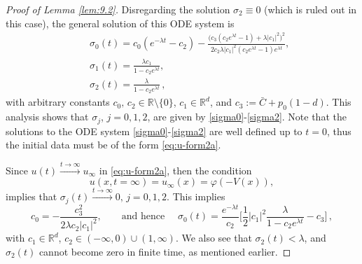 \documentclass[reqno]{amsart}
\newcommand{\R}{\mathbb{R}}
\begin{document}
\begin{proof}[Proof of Lemma \ref{lem:9.2}]
Disregarding the solution $\sigma_2\equiv0$ (which is ruled out in this case), the general solution of this ODE system is
\begin{eqnarray}
    && \sigma_0(t) =c_0(e^{-\lambda t}-c_2)-\frac{\big(c_3(c_2e^{\lambda t}-1)+\lambda|c_1|^2\Big)^2}{2c_2\lambda|c_1|^2(c_2e^{\lambda t}-1)e^{\lambda t}}, \label{sigma0}\\
    && \sigma_1(t)=\frac{\lambda c_1}{1-c_2 e^{\lambda t}}, \nonumber \\ %
    && \sigma_2(t)= \frac{\lambda}{1-c_2 e^{\lambda t}}\,, \label{sigma2}
\end{eqnarray}
with arbitrary constants $c_0,\,c_2\in\R\setminus\{0\}$, $c_1\in\R^d$, and $c_3:=\bar C+p_0(1-d)$. This analysis shows that $\sigma_j$, $j=0,1,2$, are given by \eqref{sigma0}-\eqref{sigma2}. Note that the solutions to the ODE system \eqref{sigma0}-\eqref{sigma2} are well defined up to $t=0$, thus the initial data must be of the form \eqref{eq:u-form2a}.

Since $u(t)\stackrel{t\to\infty}{\longrightarrow} u_\infty$ in \eqref{eq:u-form2a}, then the condition 
\begin{equation}\label{u-at-infty-a}
    u(x,t=\infty)=u_\infty(x)=\varphi(-V(x)),  
\end{equation}
implies that $\sigma_j(t)\stackrel{t\to\infty}{\longrightarrow}0,\,j=0,1,2$. This implies
\begin{equation*} %
   c_0=-\frac{c_3^2}{2\lambda c_2|c_1|^2},\qquad \mbox{and hence } \quad \sigma_0(t)=\frac{e^{-\lambda t}}{c_2} \Big[\frac12 |c_1|^2 \frac{\lambda}{1-c_2 e^{\lambda t}}-c_3\Big]\,,
\end{equation*}
with $c_1\in\R^d$, $c_2\in(-\infty,0)\cup(1,\infty)$.
We also see that $\sigma_2(t)<\lambda$, and $\sigma_2(t)$ cannot become zero in finite time, as mentioned earlier. 


\end{proof}
\end{document}
